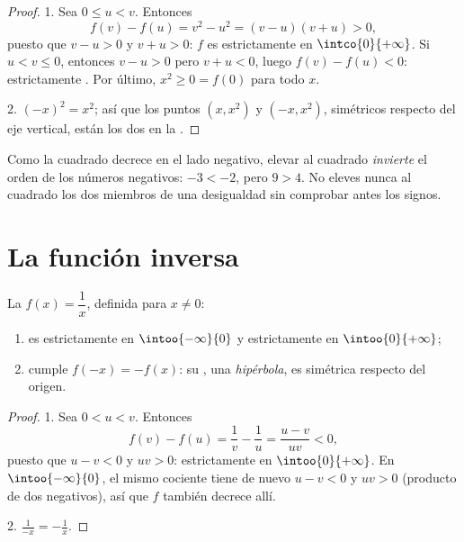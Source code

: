 \begin{proof}
1. Sea $0 \leq u < v$. Entonces
\[
f(v) - f(u) = v^2 - u^2 = (v - u)(v + u) > 0,
\]
puesto que $v - u > 0$ y $v + u > 0$: $f$ es estrictamente  en
$\intco{0}{+\infty}$. Si $u < v \leq 0$, entonces $v - u > 0$ pero
$v + u < 0$, luego $f(v) - f(u) < 0$: estrictamente . Por
último, $x^2 \geq 0 = f(0)$ para todo $x$.

2. $(-x)^2 = x^2$; así que los puntos $(x, x^2)$ y $(-x, x^2)$, simétricos
respecto del eje vertical, están los dos en la .
\end{proof}

\begin{remark}
Como la  cuadrado decrece en el lado negativo, elevar al cuadrado
\emph{invierte} el orden de los números negativos: $-3 < -2$, pero
$9 > 4$. No eleves nunca al cuadrado los dos miembros de una desigualdad
sin comprobar antes los signos.
\end{remark}

\section{La función inversa}

\begin{proposition}\label{prop:g10:reffunc:inverse}
La  $f(x) = \dfrac1x$, definida para $x \neq 0$:
\begin{enumerate}
  \item es estrictamente  en $\intoo{-\infty}{0}$ y
        estrictamente  en $\intoo{0}{+\infty}$;
  \item cumple $f(-x) = -f(x)$: su , una
        \emph{hipérbola}, es simétrica respecto del
        origen.
\end{enumerate}
\end{proposition}

\begin{proof}
1. Sea $0 < u < v$. Entonces
\[
f(v) - f(u) = \frac1v - \frac1u = \frac{u - v}{uv} < 0,
\]
puesto que $u - v < 0$ y $uv > 0$: estrictamente  en
$\intoo{0}{+\infty}$. En $\intoo{-\infty}{0}$, el mismo cociente tiene de
nuevo $u - v < 0$ y $uv > 0$ (producto de dos negativos), así que $f$
también decrece allí.

2. $\frac{1}{-x} = -\frac1x$.
\end{proof}

